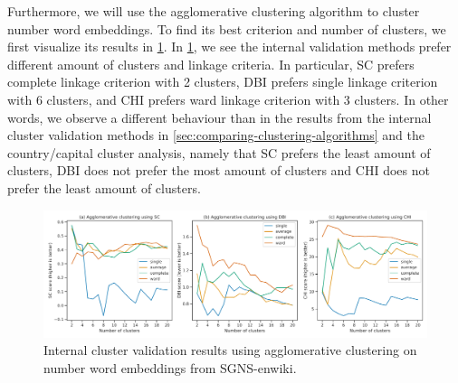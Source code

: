 Furthermore, we will use the agglomerative clustering algorithm to cluster number word embeddings. To find its best criterion and number of clusters, we first visualize its results in \cref{fig:cluster-analysis-agglomerative-numbers-word-group-internal-cluster-validation}. In \cref{fig:cluster-analysis-agglomerative-numbers-word-group-internal-cluster-validation}, we see the internal validation methods prefer different amount of clusters and linkage criteria. In particular, SC prefers complete linkage criterion with 2 clusters, DBI prefers single linkage criterion with 6 clusters, and CHI prefers ward linkage criterion with 3 clusters. In other words, we observe a different behaviour than in the results from the internal cluster validation methods in \cref{sec:comparing-clustering-algorithms} and the country/capital cluster analysis, namely that SC prefers the least amount of clusters, DBI does not prefer the most amount of clusters and CHI does not prefer the least amount of clusters.
\begin{figure}[H]
    \centering
    \includegraphics[width=\textwidth]{thesis/figures/cluster-analysis-agglomerative-numbers-word-group-internal-cluster-validation.pdf}
    \caption{Internal cluster validation results using agglomerative clustering on number word embeddings from SGNS-enwiki.}
    \label{fig:cluster-analysis-agglomerative-numbers-word-group-internal-cluster-validation}
\end{figure}

